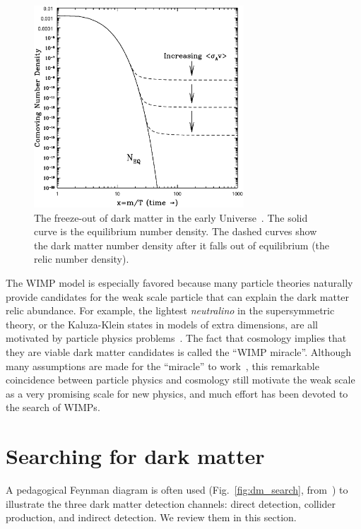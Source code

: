 \documentclass[doublespace,nopageskip]{VTthesis}
\begin{document}
\begin{figure}[htb]
    \centering
    \includegraphics[width=0.7\textwidth]{Figures/Intro/freezeout.ps}
    \caption{The freeze-out of dark matter in the early Universe~\cite{2009arXiv0901.4090H}. The solid curve is the equilibrium number density. The dashed curves show the dark matter number density after it falls out of equilibrium (the relic number density).}
    \label{fig:freeze-out}
\end{figure}

The WIMP model is especially favored because many particle theories naturally provide candidates for the weak scale particle that can explain the dark matter relic abundance. For example, the lightest \textit{neutralino} in the supersymmetric theory, or the Kaluza-Klein states in models of extra dimensions, are all motivated by particle physics problems~\cite{2005PhR...405..279B}. The fact that cosmology implies that they are viable dark matter candidates is called the ``WIMP miracle''. Although many assumptions are made for the ``miracle'' to work~\cite{2019arXiv190407915L}, this remarkable coincidence between particle physics and cosmology still motivate the weak scale as a very promising scale for new physics, and much effort has been devoted to the search of WIMPs.

\section{Searching for dark matter}\label{se:seaching}

A pedagogical Feynman diagram is often used (Fig.~\ref{fig:dm_search}, from~\citet{2019FrP.....7...75G}) to illustrate the three dark matter detection channels: direct detection, collider production, and indirect detection. We review them in this section.
\end{document}
